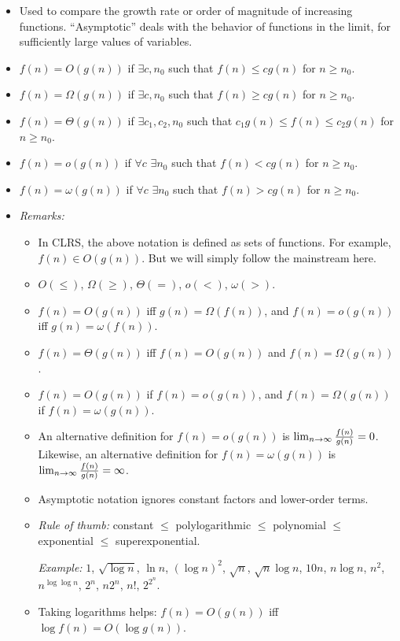 \documentclass{article}
\begin{document}
\begin{itemize}

\item Used to compare the growth rate or order of magnitude
of increasing functions. ``Asymptotic'' deals with the 
behavior of functions in the limit, for sufficiently large
values of variables.

\item $f(n)=O(g(n))$ if $\exists c, n_0$ such that 
$f(n)\le cg(n)$ for $n\ge n_0$.

\item $f(n)=\Omega(g(n))$ if $\exists c, n_0$ such that
$f(n)\ge cg(n)$ for $n\ge n_0$.

\item $f(n)=\Theta(g(n))$ if $\exists c_1, c_2, n_0$ such that
$c_1g(n)\le f(n)\le c_2g(n)$ for $n\ge n_0$.

\item $f(n)=o(g(n))$ if $\forall c$ $\exists n_0$ such that
$f(n)<cg(n)$ for $n\ge n_0$. 

\item $f(n)=\omega(g(n))$ if $\forall c$ $\exists n_0$ such that 
$f(n)>cg(n)$ for $n\ge n_0$.

\item {\em Remarks:} 
\begin{itemize}
\item In CLRS, the above notation is defined as sets of functions.
For example, $f(n)\in O(g(n))$. But we will simply follow
the mainstream here.
\item $O(\le)$, $\Omega(\ge)$, $\Theta(=)$, $o(<)$, $\omega(>)$.
\item $f(n)=O(g(n))$ iff $g(n)=\Omega(f(n))$, and
$f(n)=o(g(n))$ iff $g(n)=\omega(f(n))$.
\item $f(n)=\Theta(g(n))$ iff $f(n)=O(g(n))$ and $f(n)=\Omega(g(n))$.
\item $f(n)=O(g(n))$ if $f(n)=o(g(n))$, and
$f(n)=\Omega(g(n))$ if $f(n)=\omega(g(n))$.
\item An alternative definition for $f(n)=o(g(n))$ is 
$\lim_{n\to\infty}{f(n)\over g(n)}=0$. Likewise, an alternative definition
for $f(n)=\omega(g(n))$ is $\lim_{n\to\infty}{f(n)\over g(n)}=\infty$.
\item Asymptotic notation ignores constant factors and lower-order terms.
\item {\em Rule of thumb:} constant $\le$ polylogarithmic $\le$ polynomial
$\le$ exponential $\le$ superexponential.

{\em Example:} $1$, $\sqrt{\log n}$, $\ln n$, $(\log n)^2$, $\sqrt n$,
$\sqrt n \log n$, $10n$, $n\log n$, $n^2$, $n^{\log\log n}$,
$2^n$, $n2^n$, $n!$, $2^{2^n}$.
\item Taking logarithms helps: $f(n)=O(g(n))$ iff $\log f(n)=O(\log g(n))$.
\end{itemize}

\end{itemize}
\end{document}
